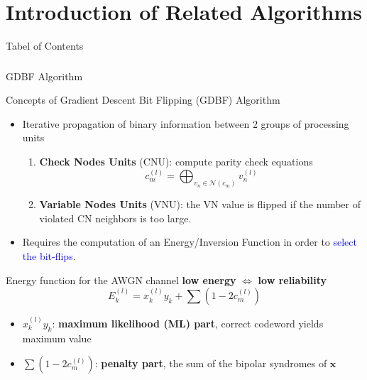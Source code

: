 \documentclass[aspectratio=169,8pt]{beamer}
\begin{document}
\section{Introduction of Related Algorithms}

\begin{frame}{Tabel of Contents}{}
	\frametitle{}
	\tableofcontents[currentsection]
\end{frame}

\begin{frame}{GDBF Algorithm}
  \vspace{-0.35cm}
  \begin{block}{Concepts of Gradient Descent Bit Flipping (GDBF) Algorithm}
    \begin{itemize}
      \item Iterative propagation of binary information between 2 groups of processing units
      \begin{enumerate}
        \item \textbf{Check Nodes Units} (CNU): compute parity check equations
        \begin{equation*}
          c_m^{(l)}=\bigoplus_{v_n \in \mathcal{N}(c_m)} v_n^{(l)}
        \end{equation*}
        \item \textbf{Variable Nodes Units} (VNU): the VN value is flipped if the number of violated CN neighbors is too large.
      \end{enumerate}
      \item Requires the computation of an Energy/Inversion Function in order to  \textcolor{blue}{select the bit-flips}.
    \end{itemize}
  \end{block}

  \begin{block}{Energy function for the AWGN channel}
    \setlength{\belowdisplayskip}{0pt}
    \setlength{\belowdisplayshortskip}{0pt}
    \centering \alert{\textbf{low energy}} \(\Leftrightarrow\) \alert{\textbf{low reliability}}
    \begin{equation*}
      E_{k}^{(l)} = x_k^{(l)} y_k + \sum (1-2c_m^{(l)})
    \end{equation*}
    \begin{itemize}
      \item \(x_k^{(l)} y_k\):\textbf{ maximum likelihood (ML) part}, correct codeword yields maximum value
      \item \(\sum (1-2c_m^{(l)})\): \textbf{penalty part}, the sum of the bipolar syndromes of \(\mathbf{x}\)
    \end{itemize}
    \end{block}
\end{frame}
\end{document}
